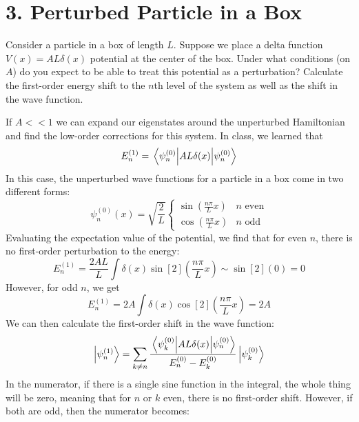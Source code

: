 \documentclass[a4paper,twoside]{article}
\begin{document}
\section*{3. Perturbed Particle in a Box}
Consider a particle in a box of length $ L $. Suppose we place a delta function $ V(x) = AL \delta(x) $ potential at the center of the box. Under what conditions (on $ A $) do you expect to be able to treat this potential as a perturbation? Calculate the first-order energy shift to the $ n $th level of the system as well as the shift in the wave function.
\begin{problem}
    If $ A << 1 $ we can expand our eigenstates around the unperturbed Hamiltonian and find the low-order corrections for this system. In class, we learned that
    \begin{equation}
        E_n^{(1)} = \ev{A L \delta(x)}{\psi_n^{(0)}}
    \end{equation}
    In this case, the unperturbed wave functions for a particle in a box come in two different forms:
    \begin{equation}
        \psi_n^{(0)}(x) = \sqrt{\frac{2}{L}} \begin{cases} \sin(\frac{n \pi}{L} x) & n \text{ even} \\ \cos(\frac{n \pi}{L} x) & n \text{ odd} \end{cases} 
    \end{equation}
    Evaluating the expectation value of the potential, we find that for even $ n $, there is no first-order perturbation to the energy:
    \begin{equation}
        E_n^{(1)} = \frac{2AL}{L} \int \delta(x) \sin[2](\frac{n \pi}{L} x) \sim \sin[2](0) = 0
    \end{equation}
    However, for odd $ n $, we get
    \begin{equation}
        E_n^{(1)} = 2A \int \delta(x) \cos[2](\frac{n \pi}{L} x) = 2A
    \end{equation}
    We can then calculate the first-order shift in the wave function:
    \begin{equation}
        \ket{\psi_n^{(1)}} = \sum_{k \neq n} \frac{\mel{\psi_k^{(0)}}{AL \delta(x)}{\psi_n^{(0)}}}{E_n^{(0)} - E_k^{(0)}}\ket{\psi_k^{(0)}}
    \end{equation}
    In the numerator, if there is a single sine function in the integral, the whole thing will be zero, meaning that for $ n $ or $ k $ even, there is no first-order shift. However, if both are odd, then the numerator becomes:
    \begin{equation}

\end{equation}
\end{problem}
\end{document}
